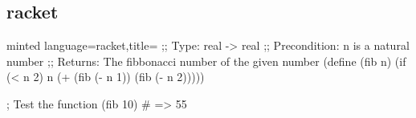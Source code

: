 \documentclass[
    ngerman,
    accentcolor=3b,
    dark_mode,
    fontsize=12pt,
    a4paper,
    aspectratio=169,
    colorback=true,
    fancy_row_colors,
    leqno,
    fleqn,
    boxarc,
    fleqn,
]{algoslides}
\begin{document}
    \subsection{racket}
    \begin{frame}[fragile,c]
        \slidehead{}
        \begin{codeBlock}[]{minted language=racket,title=}
        ;; Type: real -> real
        ;; Precondition: n is a natural number
        ;; Returns: The fibbonacci number of the given number
        (define (fib n)
            (if (< n 2)
                n
                (+ (fib (- n 1)) (fib (- n 2)))))

        ; Test the function
        (fib 10) # => 55
    \end{codeBlock}
    \end{frame}
\end{document}
